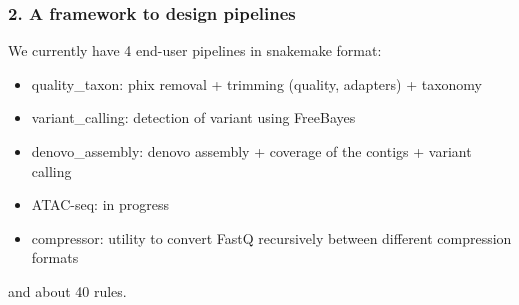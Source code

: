 \documentclass{beamer}
\begin{document}
\begin{frame}[fragile]
    \frametitle{2. A framework to design pipelines}
    \tiny
    We currently have 4 end-user pipelines in snakemake format:
    \begin{block}{}
    \begin{itemize}
      \item quality\_taxon: phix removal + trimming (quality, adapters) + taxonomy
      \item variant\_calling: detection of variant  using FreeBayes
      \item denovo\_assembly: denovo assembly + coverage of the contigs + variant calling
      \item ATAC-seq: in progress
      \item compressor: utility to convert FastQ recursively between different compression formats
    \end{itemize}
    
    \end{block}
    and about 40 rules. 
    

\end{frame}
\end{document}

